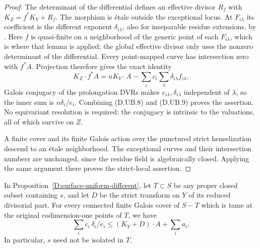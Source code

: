 \begin{proof}
The determinant of the differential defines an effective
divisor $R_f$ with $K_Z=f^*K_Y+R_f$. The morphism is
\'etale outside the exceptional locus. At $F_{i\lambda}$
its coefficient is the different exponent
$\delta_{i\lambda}$, also for inseparable residue extensions,
by \cite[Lemma 49.12.6, Tag 0BWJ]{StacksDDifferent}.
Here $f$ is quasi-finite on a neighborhood of the generic
point of each $F_{i\lambda}$, which is where that lemma is
applied; the global effective divisor only uses the
nonzero determinant of the differential.
Every point-mapped curve has intersection zero with $f^*A$.
Projection therefore gives the exact identity
\[
    K_Z\cdot f^*A
       =nK_Y\cdot A-
           \sum_i c_i\sum_\lambda\delta_{i\lambda}f_{i\lambda}.
                                                               \tag{D.UB.9}
\]
Galois conjugacy of the prolongation DVRs makes
$e_{i\lambda},\delta_{i\lambda}$ independent of $\lambda$,
so the inner sum is $n\delta_i/e_i$.
Combining (D.UB.8) and (D.UB.9) proves the assertion.
No equivariant resolution is required: the conjugacy is
intrinsic to the valuations, all of which survive on $Z$.

A finite cover and its finite Galois action over the punctured
strict henselization descend to an \'etale neighborhood.
The exceptional curves and their intersection numbers
are unchanged, since the residue field is algebraically
closed. Applying the same argument there proves the
strict-local assertion.
\end{proof}

\begin{proposition}
\label{D:fixed-boundary-uniform-different}
In Proposition~\ref{D:surface-uniform-different}, let $T\subset S$
be any proper closed subset containing $s$, and let $D$ be
the strict transform on $Y$ of its reduced divisorial part.
For every connected finite Galois cover of $S-T$ which is
tame at the original codimension-one points of $T$, we have
\[
         \sum_i c_i\,\delta_i/e_i
                     \leq (K_Y+D)\cdot A+\sum_i a_i.       \tag{D.UB.10}
\]
In particular, $s$ need not be isolated in $T$.
\end{proposition}

